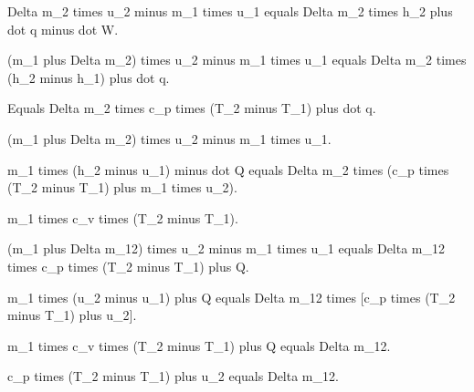 Delta m_2 times u_2 minus m_1 times u_1 equals Delta m_2 times h_2 plus dot q minus dot W.

(m_1 plus Delta m_2) times u_2 minus m_1 times u_1 equals Delta m_2 times (h_2 minus h_1) plus dot q.

Equals Delta m_2 times c_p times (T_2 minus T_1) plus dot q.

(m_1 plus Delta m_2) times u_2 minus m_1 times u_1.

m_1 times (h_2 minus u_1) minus dot Q equals Delta m_2 times (c_p times (T_2 minus T_1) plus m_1 times u_2).

m_1 times c_v times (T_2 minus T_1).

(m_1 plus Delta m_12) times u_2 minus m_1 times u_1 equals Delta m_12 times c_p times (T_2 minus T_1) plus Q.

m_1 times (u_2 minus u_1) plus Q equals Delta m_12 times [c_p times (T_2 minus T_1) plus u_2].

m_1 times c_v times (T_2 minus T_1) plus Q equals Delta m_12.

c_p times (T_2 minus T_1) plus u_2 equals Delta m_12.